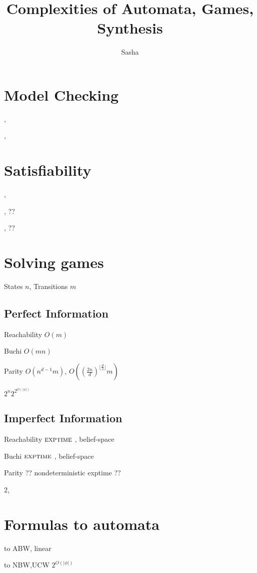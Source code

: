 \documentclass[a4paper,10pt]{article}
\title{Complexities of Automata, Games, Synthesis}
\author{Sasha}
\begin{document}
\maketitle

\section{Model Checking}

\LTL, \CTLS \pspace

\CTL, \ptime

\section{Satisfiability}

\LTL, \pspace

\CTLS, ??

\CTL, ??

\section{Solving games}
States $n$, Transitions $m$

\subsection{Perfect Information}

Reachability $O(m)$ 

Buchi $O(mn)$ 

Parity $O(n^{d-1}m)$, $O((\frac{2n}{d})^{\lfloor \frac{d}{2} \rfloor} m)$

\LTL $2^n 2^{2^{O(|\psi|)}}$


\subsection{Imperfect Information}

Reachability $\textsc{exptime}$ \cite{CDHR06, Reif}, belief-space

Buchi $\textsc{exptime}$ \cite{CDHR06}, belief-space

Parity ?? nondeterministic exptime ??

\LTL $2$\exptime, \cite{KV}

\section{Formulas to automata} 
\LTL to ABW, linear 

\LTL to NBW,UCW $2^{O(|\phi|)}$ 
\end{document}
